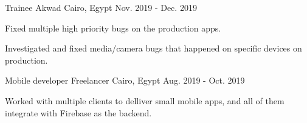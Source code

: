 \begin{cventries}
  \cventry
    {Trainee} %
    {Akwad} %
    {Cairo, Egypt} %
    {Nov. 2019 - Dec. 2019} %
    {
      \begin{cvitems}
        \item {Fixed multiple high priority bugs on the production apps.}
        \item {Investigated and fixed media/camera bugs that happened on specific devices on production.}
      \end{cvitems}
    }

  \cventry
    {Mobile developer} %
    {Freelancer} %
    {Cairo, Egypt} %
    {Aug. 2019 - Oct. 2019} %
    {
      \begin{cvitems}
        Worked with multiple clients to delliver small mobile apps, and all of them integrate with Firebase as the backend.
      \end{cvitems}
    }

\end{cventries}
  
